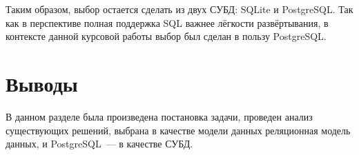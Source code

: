 Таким образом, выбор остается сделать из двух СУБД: SQLite и PostgreSQL. Так как в перспективе полная поддержка SQL важнее лёгкости развёртывания, в контексте данной курсовой работы выбор был сделан в пользу PostgreSQL.

\section{Выводы}%
\label{sec:vyvody}

В данном разделе была произведена постановка задачи, проведен анализ существующих решений, выбрана в качестве модели данных реляционная модель данных, и PostgreSQL~--- в качестве СУБД.
